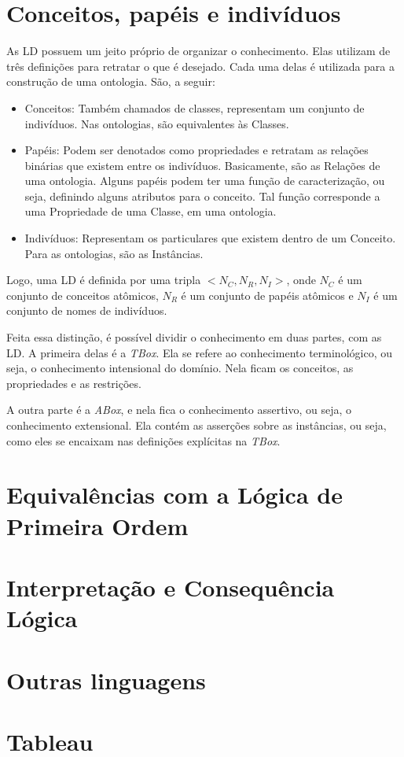 \section{Conceitos, papéis e indivíduos}

As LD possuem um jeito próprio de organizar o conhecimento. Elas utilizam de três definições para retratar o que é desejado. Cada uma delas é utilizada para a construção de uma ontologia. São, a seguir:

\begin{itemize}
	\item Conceitos: Também chamados de classes, representam um conjunto de indivíduos. Nas ontologias, são equivalentes às Classes.
	\item Papéis: Podem ser denotados como propriedades e retratam as relações binárias que existem entre os indivíduos. Basicamente, são as Relações de uma ontologia. Alguns papéis podem ter uma função de caracterização, ou seja, definindo alguns atributos para o conceito. Tal função corresponde a uma Propriedade de uma Classe, em uma ontologia.
	\item Indivíduos: Representam os particulares que existem dentro de um Conceito. Para as ontologias, são as Instâncias.
\end{itemize}

Logo, uma LD é definida por uma tripla $ <N_C, N_R, N_I> $, onde $ N_C $ é um conjunto de conceitos atômicos, $ N_R $ é um conjunto de papéis atômicos e $ N_I $ é um conjunto de nomes de indivíduos.

Feita essa distinção, é possível dividir o conhecimento em duas partes, com as LD. A primeira delas é a \textit{TBox}. Ela se refere ao conhecimento terminológico, ou seja, o conhecimento intensional do domínio. Nela ficam os conceitos, as propriedades e as restrições.

A outra parte é a \textit{ABox}, e nela fica o conhecimento assertivo, ou seja, o conhecimento extensional. Ela contém as asserções sobre as instâncias, ou seja, como eles se encaixam nas definições explícitas na \textit{TBox}.

\section{Equivalências com a Lógica de Primeira Ordem}

\section{Interpretação e Consequência Lógica}

\section{Outras linguagens}

\section{Tableau}